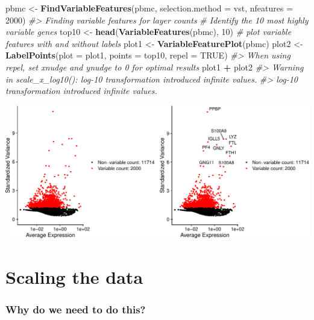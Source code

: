 \documentclass[
]{book}
\newenvironment{Shaded}{\begin{snugshade}}{\end{snugshade}}
\newcommand{\AttributeTok}[1]{\textcolor[rgb]{0.13,0.29,0.53}{#1}}
\newcommand{\CommentTok}[1]{\textcolor[rgb]{0.56,0.35,0.01}{\textit{#1}}}
\newcommand{\ConstantTok}[1]{\textcolor[rgb]{0.56,0.35,0.01}{#1}}
\newcommand{\DecValTok}[1]{\textcolor[rgb]{0.00,0.00,0.81}{#1}}
\newcommand{\FunctionTok}[1]{\textcolor[rgb]{0.13,0.29,0.53}{\textbf{#1}}}
\newcommand{\NormalTok}[1]{#1}
\newcommand{\OtherTok}[1]{\textcolor[rgb]{0.56,0.35,0.01}{#1}}
\newcommand{\SpecialCharTok}[1]{\textcolor[rgb]{0.81,0.36,0.00}{\textbf{#1}}}
\newcommand{\StringTok}[1]{\textcolor[rgb]{0.31,0.60,0.02}{#1}}
\begin{document}
\begin{Shaded}
\begin{Highlighting}[]
\NormalTok{pbmc }\OtherTok{\textless{}{-}} \FunctionTok{FindVariableFeatures}\NormalTok{(pbmc, }\AttributeTok{selection.method =} \StringTok{\textquotesingle{}vst\textquotesingle{}}\NormalTok{, }\AttributeTok{nfeatures =} \DecValTok{2000}\NormalTok{)}
\CommentTok{\#\textgreater{} Finding variable features for layer counts}
\CommentTok{\# Identify the 10 most highly variable genes}
\NormalTok{top10 }\OtherTok{\textless{}{-}} \FunctionTok{head}\NormalTok{(}\FunctionTok{VariableFeatures}\NormalTok{(pbmc), }\DecValTok{10}\NormalTok{)}
\CommentTok{\# plot variable features with and without labels}
\NormalTok{plot1 }\OtherTok{\textless{}{-}} \FunctionTok{VariableFeaturePlot}\NormalTok{(pbmc)}
\NormalTok{plot2 }\OtherTok{\textless{}{-}} \FunctionTok{LabelPoints}\NormalTok{(}\AttributeTok{plot =}\NormalTok{ plot1, }\AttributeTok{points =}\NormalTok{ top10, }\AttributeTok{repel =} \ConstantTok{TRUE}\NormalTok{)}
\CommentTok{\#\textgreater{} When using repel, set xnudge and ynudge to 0 for optimal results}
\NormalTok{plot1 }\SpecialCharTok{+}\NormalTok{ plot2}
\CommentTok{\#\textgreater{} Warning in scale\_x\_log10(): log{-}10 transformation introduced infinite values.}
\CommentTok{\#\textgreater{} log{-}10 transformation introduced infinite values.}
\end{Highlighting}
\end{Shaded}

\includegraphics{scRNAseqInR_Doco_files/figure-latex/var_features-1.pdf}

\section{Scaling the data}\label{scaling-the-data}

\subsubsection*{Why do we need to do this?}\label{why-do-we-need-to-do-this-3}
\end{document}
